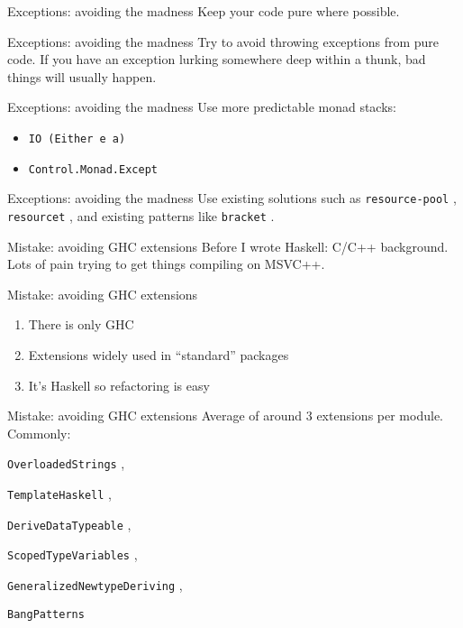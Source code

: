 \documentclass[20pt]{beamer}
\newcommand{\code}[1]{
    \texttt{\small{#1}}
}
\begin{document}
\begin{frame}{Exceptions: avoiding the madness}
    Keep your code pure where possible.
\end{frame}

\begin{frame}{Exceptions: avoiding the madness}
    Try to avoid throwing exceptions from pure code. If you have an exception
    lurking somewhere deep within a thunk, bad things will usually happen.
\end{frame}

\begin{frame}{Exceptions: avoiding the madness}
    Use more predictable monad stacks:
    \begin{itemize}
    \item \code{IO (Either e a)}
    \item \code{Control.Monad.Except}
    \end{itemize}
\end{frame}

\begin{frame}{Exceptions: avoiding the madness}
    Use existing solutions such as \code{resource-pool}, \code{resourcet}, and
    existing patterns like \code{bracket}.
\end{frame}


\begin{frame}{Mistake: avoiding GHC extensions}
    Before I wrote Haskell: C/C++ background. Lots of pain trying to get things
    compiling on MSVC++.
\end{frame}

\begin{frame}{Mistake: avoiding GHC extensions}
    \begin{enumerate}
    \item There is only GHC
    \item Extensions widely used in ``standard'' packages
    \item It's Haskell so refactoring is easy
    \end{enumerate}
\end{frame}

\begin{frame}{Mistake: avoiding GHC extensions}
    Average of around 3 extensions per module. Commonly:
    \code{OverloadedStrings},
    \code{TemplateHaskell},
    \code{DeriveDataTypeable},
    \code{ScopedTypeVariables},
    \code{GeneralizedNewtypeDeriving},
    \code{BangPatterns}
\end{frame}
\end{document}
